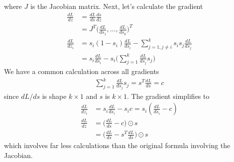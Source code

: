 \documentclass[../../deep_learning_notes.tex]{subfiles}
\begin{document}
where $J$ is the Jacobian matrix. Next, let's calculate the gradient
\begin{align*}
    \frac{dL}{dz} &= \frac{dL}{ds} \frac{ds}{dz}\\
    &= J^{T} \bigg( \frac{dL}{ds_{1}}, \ldots, \frac{dL}{ds_{k}} \bigg)^{T}\\
    \frac{dL}{dz_{i}} &= s_{i}(1-s_{i})\frac{dL}{ds_{i}} - \sum_{j=1, j\neq i}^{k}s_{i}s_{j}\frac{dL}{ds_{j}}\\
    &= s_{i}\frac{dL}{ds_{i}} - s_{i} \bigg( \sum_{j=1}^{k}\frac{dL}{ds_{j}}s_{j} \bigg)
\end{align*}
We have a common calculation across all gradients
\begin{align*}
    \sum_{j=1}^{k}\frac{dL}{ds_{j}}s_{j} = s^{T}\frac{dL}{ds} = c
\end{align*}
since $dL/ds$ is shape $k \times 1$ and $s$ is $k \times 1$. The gradient simplifies to
\begin{align*}
    \frac{dL}{dz_{i}} &= s_{i}\frac{dL}{ds_{i}} - s_{i}c = s_{i}(\frac{dL}{ds_{i}} - c)\\
    \frac{dL}{dz} &= \bigg(\frac{dL}{ds} - c \bigg) \odot s\\
    &= \bigg( \frac{dL}{ds} - s^{T}\frac{dL}{ds} \bigg) \odot s
\end{align*}
which involves far less calculations than the original formula involving the Jacobian.
\end{document}
